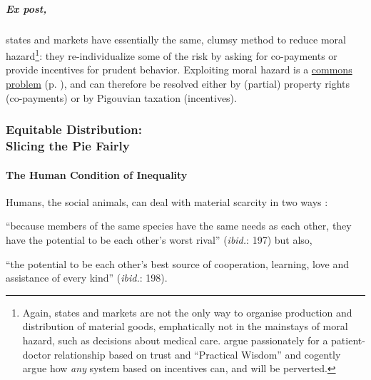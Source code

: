 \subparagraph{Ex post,} states and markets have essentially the same, clumsy method to reduce moral hazard\footnote{
	Again, states and markets are not the only way to organise production and distribution of material goods, emphatically not in the mainstays of moral hazard, such as decisions about medical care. \cite{Schwartz2010} argue passionately for a patient-doctor relationship based on trust and ``Practical Wisdom'' and cogently argue how \emph{any} system based on incentives can, and will be perverted.}: 
they re-individualize some of the risk by asking for co-payments or provide incentives for prudent behavior. Exploiting moral hazard is a \hyperref[sec:common_good]{commons problem} (p. \pageref{sec:common_good}), and can therefore be resolved either by (partial) property rights (co-payments) or by Pigouvian taxation (incentives).

\subsubsection[Equitable Distribution]{Equitable Distribution: \\Slicing the Pie Fairly} \label{sec:distribution}


\paragraph{The Human Condition of Inequality}  \label{sec:human_condition_of_inequality} Humans, the social animals, can deal with material scarcity in two ways \citep{Pickett-2009-kx}: \begin{inparaenum}[1)]
	\item ``because members of the same species have the same needs as each other, they have the potential to be each other's worst rival'' (\emph{ibid.}: 197) but also,
	\item ``the potential to be each other's best source of cooperation, learning, love and assistance of every kind'' (\emph{ibid.}: 198). \end{inparaenum}

